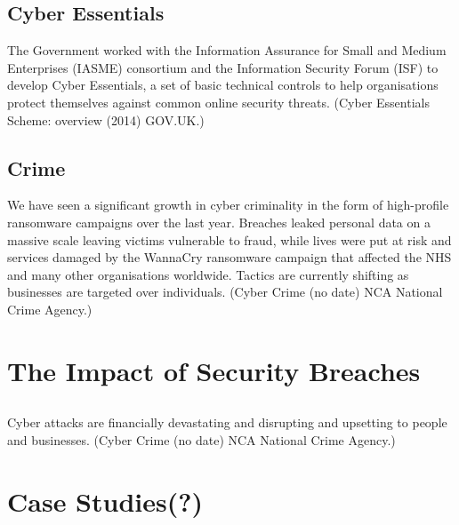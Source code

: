     \subsection{Cyber Essentials}
        The Government worked with the Information Assurance for Small and Medium Enterprises (IASME) consortium and the Information Security Forum (ISF) to develop Cyber Essentials, a set of basic technical controls to help organisations protect themselves against common online security threats. (Cyber Essentials Scheme: overview (2014) GOV.UK.)
    \subsection{Crime}
        We have seen a significant growth in cyber criminality in the form of high-profile ransomware campaigns over the last year. Breaches leaked personal data on a massive scale leaving victims vulnerable to fraud, while lives were put at risk and services damaged by the WannaCry ransomware campaign that affected the NHS and many other organisations worldwide. Tactics are currently shifting as businesses are targeted over individuals. (Cyber Crime (no date) NCA National Crime Agency.)

\section{The Impact of Security Breaches}
    \subsection{}
        Cyber attacks are financially devastating and disrupting and upsetting to people and businesses. (Cyber Crime (no date) NCA National Crime Agency.)

\section{Case Studies(?)}
